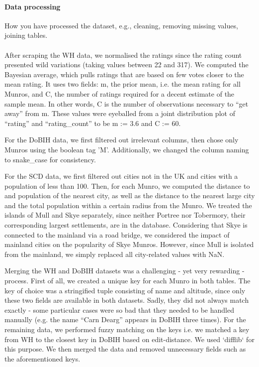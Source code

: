 \documentclass[11pt,a4paper]{article}
\begin{document}
\paragraph{Data processing} How you have processed the dataset, e.g.,
cleaning, removing missing values, joining tables.\\ \\
After scraping the WH data, we normalised the ratings since the rating count presented wild variations (taking values between 22 and 317). We computed the Bayesian average, which pulls ratings that are based on few votes closer to the mean rating. It uses two fields: m, the prior mean, i.e. the mean rating for all Munros, and C, the number of ratings required for a decent estimate of the sample mean. In other words, C is the number of observations necessary to “get away” from m. These values were eyeballed from a joint distribution plot of “rating” and “rating\_count” to be m := 3.6 and C := 60.

\smallskip
For the DoBIH data, we first filtered out irrelevant columns, then chose only Munros using the boolean tag 'M'. Additionally, we changed the column naming to snake\_case for consistency.

\smallskip
For the SCD data, we first filtered out cities not in the UK and cities with a population of less than 100. Then, for each Munro, we computed the distance to and population of the nearest city, as well as the distance to the nearest large city and the total population within a certain radius from the Munro. We treated the islands of Mull and Skye separately, since neither Portree nor Tobermory, their corresponding largest settlements, are in the database. Considering that Skye is connected to the mainland via a road bridge, we considered the impact of mainland cities on the popularity of Skye Munros. However, since Mull is isolated from the mainland, we simply replaced all city-related values with NaN.

\medskip 
Merging the WH and DoBIH datasets was a challenging - yet very rewarding - process. First of all, we created a unique key for each Munro in both tables. The key of choice was a stringified tuple consisting of name and altitude, since only these two fields are available in both datasets. Sadly, they did not always match exactly - some particular cases were so bad that they needed to be handled manually (e.g. the name “Carn Dearg” appears in DoBIH three times). For the remaining data, we performed fuzzy matching on the keys i.e. we matched a key from WH to the closest key in DoBIH based on edit-distance.  We used `difflib` for this purpose. We then merged the data and removed unnecessary fields such as the aforementioned keys.
\end{document}

